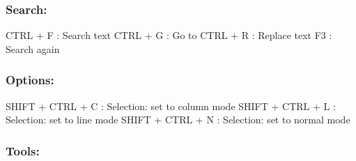 \subsubsection{Search:}

\vspace{-0.5cm}
\begin{Rtables}[caption={[Search menu keyboard shortcuts]
    Search menu keyboard shortcuts},
  label=menu:search]
  CTRL + F                : Search text
  CTRL + G                : Go to
  CTRL + R                : Replace text
  F3                      : Search again
\end{Rtables}


\subsubsection{Options:}

\vspace{-0.5cm}
\begin{Rtables}[caption={[Options menu keyboard shortcuts]
    Options menu keyboard shortcuts},
  label=menu:options]
  SHIFT + CTRL + C        : Selection: set to column mode
  SHIFT + CTRL + L        : Selection: set to line mode
  SHIFT + CTRL + N        : Selection: set to normal mode
\end{Rtables}


\subsubsection{Tools:}

